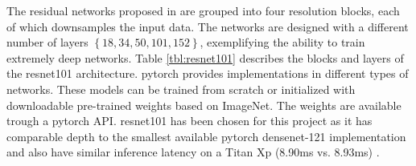 The residual networks proposed in \cite{he_deep_2015} are grouped into four resolution blocks, each of which downsamples the input data. The networks are designed with a different number of layers $ \left\{18, 34, 50, 101, 152\right\} $, exemplifying the ability to train extremely deep networks. Table \ref{tbl:resnet101} describes the blocks and layers of the \gls{resnet}101 architecture. \gls{pytorch} provides implementations in different types of networks. These models can be trained from scratch or initialized with downloadable pre-trained weights based on ImageNet. The weights are available trough a \gls{pytorch} API. \gls{resnet}101 has been chosen for this project as it has comparable depth to the smallest available \gls{pytorch} \gls{densenet}-121 implementation and also have similar inference latency on a Titan Xp (8.90ms vs. 8.93ms) \cite{bianco_benchmark_2018}.

